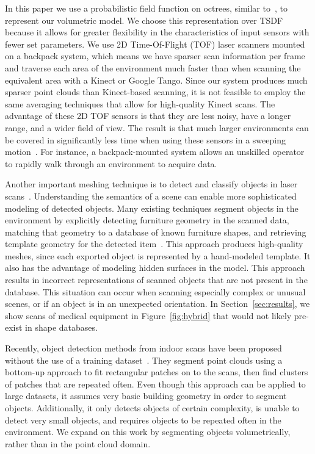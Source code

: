 \documentclass[review]{acmsiggraph}
\begin{document}
In this paper we use a probabilistic field function on octrees, similar to~\cite{Octomap}, to represent our volumetric model.  We choose this representation over TSDF because it allows for greater flexibility in the characteristics of input sensors with fewer set parameters.  We use 2D Time-Of-Flight (TOF) laser scanners mounted on a backpack system, which means we have sparser scan information per frame and traverse each area of the environment much faster than when scanning the equivalent area with a Kinect or Google Tango.  Since our system produces much sparser point clouds than Kinect-based scanning, it is not feasible to employ the same averaging techniques that allow for high-quality Kinect scans.  The advantage of these 2D TOF sensors is that they are less noisy, have a longer range, and a wider field of view.  The result is that much larger environments can be covered in significantly less time when using these sensors in a sweeping motion~\cite{Sweep}.  For instance, a backpack-mounted system allows an unskilled operator to rapidly walk through an environment to acquire data.

Another important meshing technique is to detect and classify objects in laser scans~\cite{Cadena14}.  Understanding the semantics of a scene can enable more sophisticated modeling of detected objects.  Many existing techniques segment objects in the environment by explicitly detecting furniture geometry in the scanned data, matching that geometry to a database of known furniture shapes, and retrieving template geometry for the detected item~\cite{Kim12,SearchClassifyPointcloud}.  This approach produces high-quality meshes, since each exported object is represented by a hand-modeled template.  It also has the advantage of modeling hidden surfaces in the model.  This approach results in incorrect representations of scanned objects that are not present in the database.  This situation can occur when scanning especially complex or unusual scenes, or if an object is in an unexpected orientation.  In Section~\ref{sec:results}, we show scans of medical equipment in Figure~\ref{fig:hybrid} that would not likely pre-exist in shape databases.

Recently, object detection methods from indoor scans have been proposed without the use of a training dataset~\cite{Mattausch14}.  They segment point clouds using a bottom-up approach to fit rectangular patches on to the scans, then find clusters of patches that are repeated often.  Even though this approach can be applied to large datasets, it assumes very basic building geometry in order to segment objects.  Additionally, it only detects objects of certain complexity, is unable to detect very small objects, and requires objects to be repeated often in the environment.  We expand on this work by segmenting objects volumetrically, rather than in the point cloud domain.
\end{document}
